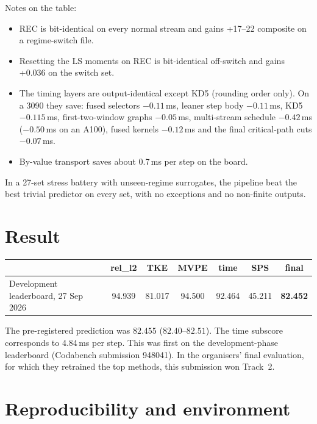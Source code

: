 \documentclass[10pt]{article}
\begin{document}
Notes on the table:
\begin{itemize}
\item REC is bit-identical on every normal stream and gains +17--22 composite on a regime-switch file.
\item Resetting the LS moments on REC is bit-identical off-switch and gains +0.036 on the switch set.
\item The timing layers are output-identical except KD5 (rounding order only). On a 3090 they save:
  fused selectors $-0.11$\,ms, leaner step body $-0.11$\,ms, KD5 $-0.115$\,ms, first-two-window graphs
  $-0.05$\,ms, multi-stream schedule $-0.42$\,ms ($-0.50$\,ms on an A100), fused kernels $-0.12$\,ms and the
  final critical-path cuts $-0.07$\,ms.
\item By-value transport saves about 0.7\,ms per step on the board.
\end{itemize}

In a 27-set stress battery with unseen-regime surrogates, the pipeline beat the best trivial predictor on every
set, with no exceptions and no non-finite outputs.

\section{Result}

\begin{center}
\begin{tabular}{lcccccc}\toprule
& rel\_l2 & TKE & MVPE & time & SPS & final\\\midrule
Development leaderboard, 27 Sep 2026 & 94.939 & 81.017 & 94.500 & 92.464 & 45.211 & \textbf{82.452}\\\bottomrule
\end{tabular}
\end{center}
The pre-registered prediction was $82.455$ ($82.40$--$82.51$). The time subscore corresponds to 4.84\,ms per step.
This was first on the development-phase leaderboard (Codabench submission 948041). In the organisers' final
evaluation, for which they retrained the top methods, this submission won Track~2.

\section{Reproducibility and environment}
\end{document}
